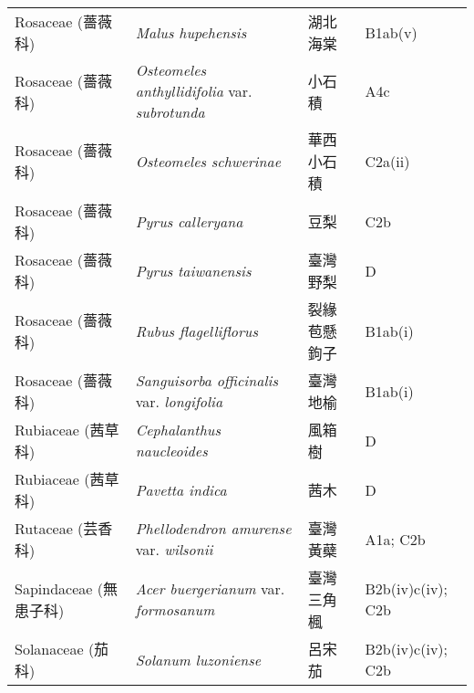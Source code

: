 \begin{longtable}{p{3cm}p{5cm}p{3cm}p{4cm}}
    Rosaceae (薔薇科) & \textit{Malus hupehensis}  & 湖北海棠 & B1ab(v) \index{Malus@\textit{Malus}!hupehensis@\textit{hupehensis}}  \index{湖北海棠} \\
    Rosaceae (薔薇科) & \textit{Osteomeles anthyllidifolia} var. \textit{subrotunda}  & 小石積 & A4c \index{Osteomeles@\textit{Osteomeles}!anthyllidifolia@\textit{anthyllidifolia}!var. subrotunda@var. \textit{subrotunda}}  \index{小石積} \\
    Rosaceae (薔薇科) & \textit{Osteomeles schwerinae}  & 華西小石積 & C2a(ii) \index{Osteomeles@\textit{Osteomeles}!schwerinae@\textit{schwerinae}}  \index{華西小石積} \\
    Rosaceae (薔薇科) & \textit{Pyrus calleryana}  & 豆梨 & C2b \index{Pyrus@\textit{Pyrus}!calleryana@\textit{calleryana}}  \index{豆梨} \\
    Rosaceae (薔薇科) & \textit{Pyrus taiwanensis}  & 臺灣野梨 & D \index{Pyrus@\textit{Pyrus}!taiwanensis@\textit{taiwanensis}}  \index{臺灣野梨} \\
    Rosaceae (薔薇科) & \textit{Rubus flagelliflorus}  & 裂緣苞懸鉤子 & B1ab(i) \index{Rubus@\textit{Rubus}!flagelliflorus@\textit{flagelliflorus}}  \index{裂緣苞懸鉤子} \\
    Rosaceae (薔薇科) & \textit{Sanguisorba officinalis} var. \textit{longifolia}  & 臺灣地榆 & B1ab(i) \index{Sanguisorba@\textit{Sanguisorba}!officinalis@\textit{officinalis}!var. longifolia@var. \textit{longifolia}}  \index{臺灣地榆} \\
    Rubiaceae (茜草科) & \textit{Cephalanthus naucleoides}  & 風箱樹 & D \index{Cephalanthus@\textit{Cephalanthus}!naucleoides@\textit{naucleoides}}  \index{風箱樹} \\
    Rubiaceae (茜草科) & \textit{Pavetta indica}  & 茜木 & D \index{Pavetta@\textit{Pavetta}!indica@\textit{indica}}  \index{茜木} \\
    Rutaceae (芸香科) & \textit{Phellodendron amurense} var. \textit{wilsonii}  & 臺灣黃蘗 & A1a; C2b \index{Phellodendron@\textit{Phellodendron}!amurense@\textit{amurense}!var. wilsonii@var. \textit{wilsonii}}  \index{臺灣黃蘗} \\
    Sapindaceae (無患子科) & \textit{Acer buergerianum} var. \textit{formosanum}  & 臺灣三角楓 & B2b(iv)c(iv); C2b \index{Acer@\textit{Acer}!buergerianum@\textit{buergerianum}!var. formosanum@var. \textit{formosanum}}  \index{臺灣三角楓} \\
    Solanaceae (茄科) & \textit{Solanum luzoniense}  & 呂宋茄 & B2b(iv)c(iv); C2b \index{Solanum@\textit{Solanum}!luzoniense@\textit{luzoniense}}  \index{呂宋茄} \\

\end{longtable}
